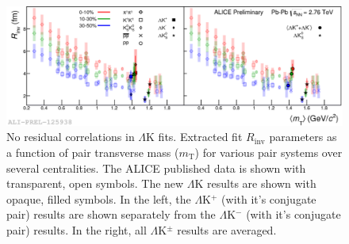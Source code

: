 \documentclass[../AnalysisNoteJBuxton.tex]{subfiles}
\begin{document}
\begin{figure}[h]
  \centering
  \includegraphics[width=\textwidth]{7_ResultsAndDiscussion/Figures/2017-Feb-03-mTscalingQMv2_MinvCalc_OutlinedPoints_OthersTransparent.png}
  \caption[$m_{\mathrm{T}}$ Scaling of Radii: No Residuals in Fit]{No residual correlations in $\Lambda$K fits.  Extracted fit $R_{\mathrm{inv}}$ parameters as a function of pair transverse mass ($m_{\mathrm{T}}$) for various pair systems over several centralities. The ALICE published data \cite{Adam:2015vja} is shown with transparent, open symbols.  The new $\Lambda$K results are shown with opaque, filled symbols.  In the left, the $\Lambda$K$^{+}$ (with it's conjugate pair) results are shown separately from the $\Lambda$K$^{-}$ (with it's conjugate pair) results.  In the right, all $\Lambda$K$^{\pm}$ results are averaged.}
  \label{fig:mTScalingOfRadii_NoRes}
\end{figure}
\end{document}
